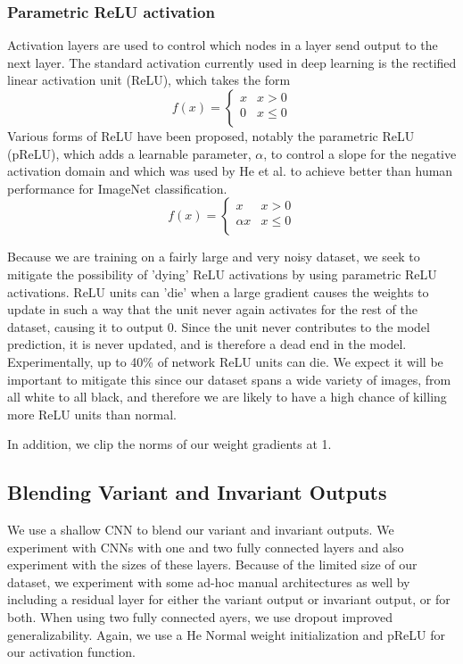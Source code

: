 \subsubsection{Parametric ReLU activation}
Activation layers are used to control which nodes in a layer send output to the next layer. The standard activation currently used in deep learning is the rectified linear activation unit (ReLU), which takes the form
\begin{equation}
	f(x) = \begin{cases}
	   x & x > 0 \\
	   0 & x\leq 0 \\
     \end{cases}
\end{equation}
Various forms of ReLU have been proposed, notably the parametric ReLU (pReLU), which adds a learnable parameter, $\alpha$, to control a slope for the negative activation domain and which was used by He et al. to achieve better than human performance for ImageNet classification.\cite{he2016deep}
\begin{equation}
	f(x) = \begin{cases}
	   x & x > 0 \\
	   \alpha x & x \leq 0 \\
     \end{cases}
\end{equation} 

Because we are training on a fairly large and very noisy dataset, we seek to mitigate the possibility of 'dying' ReLU activations by using parametric ReLU activations. ReLU units can 'die' when a large gradient causes the weights to update in such a way that the unit never again activates for the rest of the dataset, causing it to output 0. Since the unit never contributes to the model prediction, it is never updated, and is therefore a dead end in the model. Experimentally, up to 40\% of network ReLU units can die. We expect it will be important to mitigate this since our dataset spans a wide variety of images, from all white to all black, and therefore we are likely to have a high chance of killing more ReLU units than normal.

In addition, we clip the norms of our weight gradients at 1.

\subsection{Blending Variant and Invariant Outputs}
We use a shallow CNN to blend our variant and invariant outputs. We experiment with CNNs with one and two fully connected layers and also experiment with the sizes of these layers. Because of the limited size of our dataset, we experiment with some ad-hoc manual architectures as well by including a residual layer for either the variant output or invariant output, or for both. When using two fully connected ayers, we use dropout improved generalizability. Again, we use a He Normal weight initialization and pReLU for our activation function.

